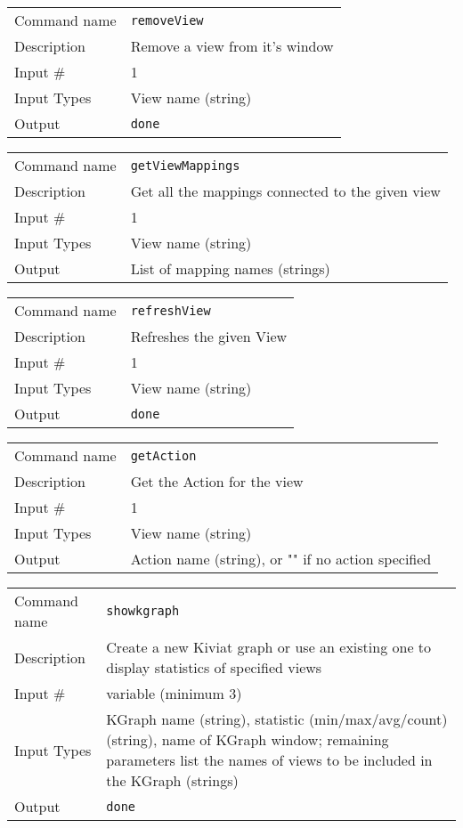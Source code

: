 \bigskip

\noindent
\begin{tabular}{l|p{5in}}
\hline
Command name & {\tt removeView} \\
Description  & Remove a view from it's window \\
Input \#     & 1 \\
Input Types  & View name (string) \\
Output       & {\tt done} \\
\hline
\end{tabular}

\bigskip

\noindent
\begin{tabular}{l|p{5in}}
\hline
Command name & {\tt getViewMappings} \\
Description  & Get all the mappings connected to the given view \\
Input \#     & 1 \\
Input Types  & View name (string) \\
Output       & List of mapping names (strings) \\
\hline
\end{tabular}

\bigskip

\noindent
\begin{tabular}{l|p{5in}}
\hline
Command name & {\tt refreshView} \\
Description  & Refreshes the given View \\
Input \#     & 1 \\
Input Types  & View name (string) \\
Output       & {\tt done} \\
\hline
\end{tabular}

\bigskip

\noindent
\begin{tabular}{l|p{5in}}
\hline
Command name & {\tt getAction} \\
Description  & Get the Action for the view \\
Input \#     & 1 \\
Input Types  & View name (string) \\
Output       & Action name (string), or "" if no action specified \\
\hline
\end{tabular}

\bigskip

\noindent
\begin{tabular}{l|p{5in}}
\hline
Command name & {\tt showkgraph} \\
Description  & Create a new Kiviat graph or use an existing one to display
               statistics of specified views \\
Input \#     & variable (minimum 3) \\
Input Types  & KGraph name (string), statistic (min/max/avg/count) (string),
               name of KGraph window; remaining parameters list the names of
               views to be included in the KGraph (strings) \\
Output       & {\tt done} \\
\hline
\end{tabular}

